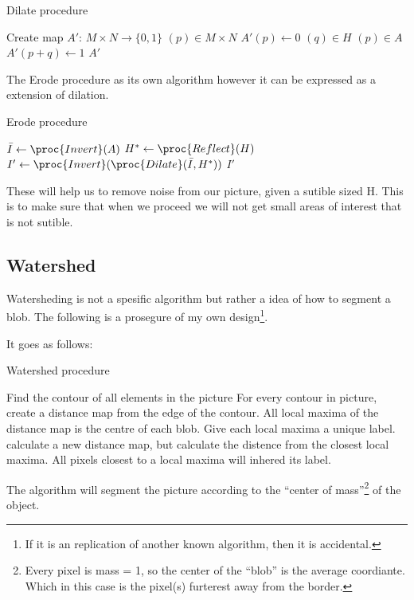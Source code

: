 \documentclass{article}
\begin{document}
\begin{algorithm}[H]
\caption{Dilate procedure}
\begin{codebox}
\li Create map $A'$: $M\times N \to \{0,1\}$
\li \For $(p)\in M\times N$
\li \Do $A'(p)\gets 0$
\End
\li \For $(q)\in H$
\li \Do \For $(p)\in A$
\li \Do $A'(p+q) \gets 1$
\End
\End 
\li \Return $A'$
\end{codebox}
\end{algorithm}
The Erode procedure as its own algorithm however it can be expressed as a extension of dilation.
\begin{algorithm}[H]
\caption{Erode procedure}
\begin{codebox}
\li $\bar{I}\gets \proc{Invert}(A)$
\li $H^*\gets \proc{Reflect}(H)$
\li $I'\gets \proc{Invert}(\proc{Dilate}(\bar{I},H^*))$
\li \Return $I'$
\end{codebox}
\end{algorithm}

These will help us to remove noise from our picture, given a sutible sized H. This is to make sure that when we proceed we will not get small areas of interest that is not sutible.

\subsection{Watershed}\label{sec:watershed}
Watersheding is not a spesific algorithm but rather a idea of how to segment a blob\cite{noauthor_watershed_2012}. The following is a prosegure of my own design\footnote{If it is an replication of another known algorithm, then it is accidental.}.

It goes as follows:
\begin{algorithm}[H]
\caption{Watershed procedure}
\begin{codebox}
\li Find the contour of all elements in the picture
\li For every contour in picture, create a distance map from the edge of the contour.
\li All local maxima of the distance map is the centre of each blob.
\li Give each local maxima a unique label.
\li calculate a new distance map, but calculate the distence from the closest local maxima.
\li All pixels closest to a local maxima will inhered its label.
\end{codebox}
\end{algorithm}

The algorithm will segment the picture according to the “center of mass”\footnote{Every pixel is mass = 1, so the center of the “blob” is the average coordiante. Which in this case is the pixel(s) furterest away from the border.} of the object.
\end{document}
